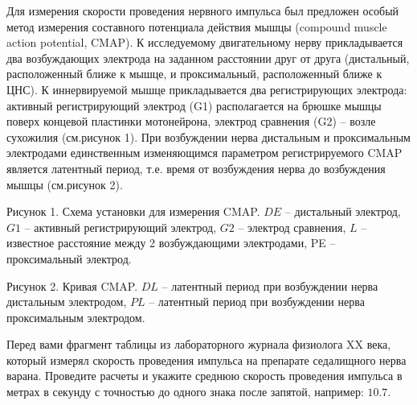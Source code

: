 
Для
измерения скорости проведения нервного импульса был предложен особый метод
измерения составного потенциала действия мышцы (compound muscle action
potential, CMAP). К исследуемому
двигательному нерву прикладывается два возбуждающих электрода на заданном
расстоянии друг от друга (дистальный,
расположенный ближе к мышце, и проксимальный,
расположенный ближе к ЦНС). К иннервируемой мышце прикладывается два
регистрирующих электрода: активный
регистрирующий электрод (G1) располагается на брюшке мышцы поверх концевой
пластинки мотонейрона, электрод
сравнения (G2) – возле сухожилия (см.рисунок 1). При возбуждении нерва
дистальным и проксимальным электродами единственным изменяющимся параметром
регистрируемого CMAP является латентный период, т.е. время от возбуждения нерва
до возбуждения мышцы (см.рисунок 2).


Рисунок
1. Схема установки для измерения CMAP. $DE$ – дистальный электрод, $G1$ – активный
регистрирующий электрод, $G2$ – электрод сравнения, $L$ – известное расстояние
между 2 возбуждающими электродами, PE – проксимальный электрод.


Рисунок
2. Кривая CMAP. $DL$  – латентный период при возбуждении нерва дистальным электродом,
$PL$  – латентный период при возбуждении нерва проксимальным электродом.

Перед вами фрагмент таблицы из лабораторного
журнала физиолога XX века, который измерял скорость проведения импульса на
препарате седалищного нерва варана. Проведите расчеты и укажите среднюю
скорость проведения импульса в метрах в секунду с точностью до одного знака
после запятой, например: $10.7$.  


\explanationSection

